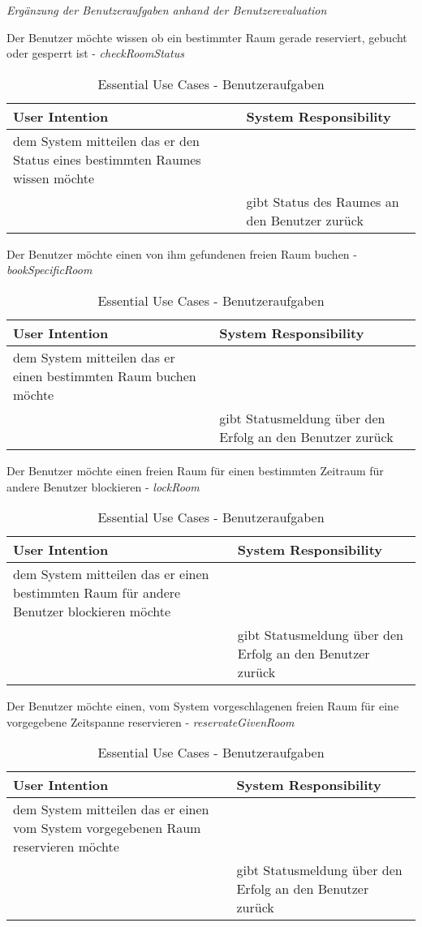 \begin{table}[h]
	\caption{Essential Use Cases - Benutzeraufgaben}
	\textit{Ergänzung der Benutzeraufgaben anhand der Benutzerevaluation}

	Der Benutzer möchte wissen ob ein bestimmter Raum gerade reserviert, gebucht oder gesperrt ist - \textit{checkRoomStatus}\\
	\begin{tabularx}{\textwidth}{|X|X|}
	\rowcolor{heading} \textbf{User Intention} & \textbf{System Responsibility}\\ \hline
	dem System mitteilen das er den Status eines bestimmten Raumes wissen möchte & \\
	 & gibt Status des Raumes an den Benutzer zurück \\ \hline
	\end{tabularx}
	
	Der Benutzer möchte einen von ihm gefundenen freien Raum buchen - \textit{bookSpecificRoom}\\
	\begin{tabularx}{\textwidth}{|X|X|}
	\rowcolor{heading} \textbf{User Intention} & \textbf{System Responsibility}\\ \hline
	dem System mitteilen das er einen bestimmten Raum buchen möchte & \\
	 & gibt Statusmeldung über den Erfolg an den Benutzer zurück \\ \hline
	\end{tabularx}
	
	Der Benutzer möchte einen freien Raum für einen bestimmten Zeitraum für andere Benutzer blockieren - \textit{lockRoom}\\
	\begin{tabularx}{\textwidth}{|X|X|}
	\rowcolor{heading} \textbf{User Intention} & \textbf{System Responsibility}\\ \hline
	dem System mitteilen das er einen bestimmten Raum für andere Benutzer blockieren möchte & \\
	 & gibt Statusmeldung über den Erfolg an den Benutzer zurück \\ \hline
	\end{tabularx}
	
	Der Benutzer möchte einen, vom System vorgeschlagenen freien Raum für eine vorgegebene Zeitspanne reservieren - \textit{reservateGivenRoom}\\
	\begin{tabularx}{\textwidth}{|X|X|}
	\rowcolor{heading} \textbf{User Intention} & \textbf{System Responsibility}\\ \hline
	dem System mitteilen das er einen vom System vorgegebenen Raum reservieren möchte & \\
	 & gibt Statusmeldung über den Erfolg an den Benutzer zurück \\ \hline
	\end{tabularx}
	

\end{table}
